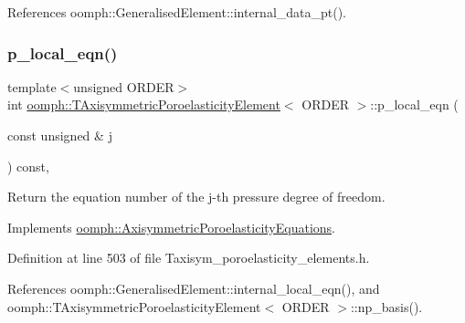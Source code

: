 References oomph\+::\+Generalised\+Element\+::internal\+\_\+data\+\_\+pt().

\mbox{\label{classoomph_1_1TAxisymmetricPoroelasticityElement_aaa12fb476f9f78e519f5fa96b065a439}} 
\subsubsection{\texorpdfstring{p\+\_\+local\+\_\+eqn()}{p\_local\_eqn()}}
{\footnotesize\ttfamily template$<$unsigned O\+R\+D\+ER$>$ \\
int \hyperlink{classoomph_1_1TAxisymmetricPoroelasticityElement}{oomph\+::\+T\+Axisymmetric\+Poroelasticity\+Element}$<$ O\+R\+D\+ER $>$\+::p\+\_\+local\+\_\+eqn (\begin{DoxyParamCaption}\item[{const unsigned \&}]{j }\end{DoxyParamCaption}) const\hspace{0.3cm}{\ttfamily [inline]}, {\ttfamily [virtual]}}



Return the equation number of the j-\/th pressure degree of freedom. 



Implements \hyperlink{classoomph_1_1AxisymmetricPoroelasticityEquations_afb2d0c38f776d9182d2cf93b37206023}{oomph\+::\+Axisymmetric\+Poroelasticity\+Equations}.



Definition at line 503 of file Taxisym\+\_\+poroelasticity\+\_\+elements.\+h.



References oomph\+::\+Generalised\+Element\+::internal\+\_\+local\+\_\+eqn(), and oomph\+::\+T\+Axisymmetric\+Poroelasticity\+Element$<$ O\+R\+D\+E\+R $>$\+::np\+\_\+basis().

\mbox{\label{classoomph_1_1TAxisymmetricPoroelasticityElement_a4fd508fc048ef38ab6cd288d58a84d13}} 
